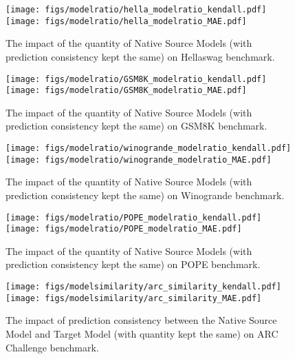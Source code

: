 \begin{figure*}[ht]
  \texttt{[image: figs/modelratio/hella\_modelratio\_kendall.pdf]} \hfill
  \texttt{[image: figs/modelratio/hella\_modelratio\_MAE.pdf]}
  \caption {The impact of the quantity of Native Source Models (with prediction consistency kept the same) on Hellaswag benchmark.}
\vspace{-0.3cm}
\label{Quantity_hellaswag}
\end{figure*}

\begin{figure*}[ht]
  \texttt{[image: figs/modelratio/GSM8K\_modelratio\_kendall.pdf]} \hfill
  \texttt{[image: figs/modelratio/GSM8K\_modelratio\_MAE.pdf]}
  \caption {The impact of the quantity of Native Source Models (with prediction consistency kept the same) on GSM8K benchmark.}
\vspace{-0.3cm}
\label{Quantity_GSM8K}
\end{figure*}

\begin{figure*}[ht]
  \texttt{[image: figs/modelratio/winogrande\_modelratio\_kendall.pdf]} \hfill
  \texttt{[image: figs/modelratio/winogrande\_modelratio\_MAE.pdf]}
  \caption {The impact of the quantity of Native Source Models (with prediction consistency kept the same) on Winogrande benchmark.}
\vspace{-0.3cm}
\label{Quantity_winogrande}
\end{figure*}

\begin{figure*}[ht]
  \texttt{[image: figs/modelratio/POPE\_modelratio\_kendall.pdf]} \hfill
  \texttt{[image: figs/modelratio/POPE\_modelratio\_MAE.pdf]}
  \caption {The impact of the quantity of Native Source Models (with prediction consistency kept the same) on POPE benchmark.}
\vspace{-0.3cm}
\label{Quantity_pope}
\end{figure*}

\begin{figure*}[ht]
  \texttt{[image: figs/modelsimilarity/arc\_similarity\_kendall.pdf]} \hfill
  \texttt{[image: figs/modelsimilarity/arc\_similarity\_MAE.pdf]}
  \caption {The impact of prediction consistency between the Native Source Model and Target Model (with quantity kept the same) on ARC Challenge benchmark.}
\vspace{-0.3cm}
\label{Similarity_arc}
\end{figure*}

